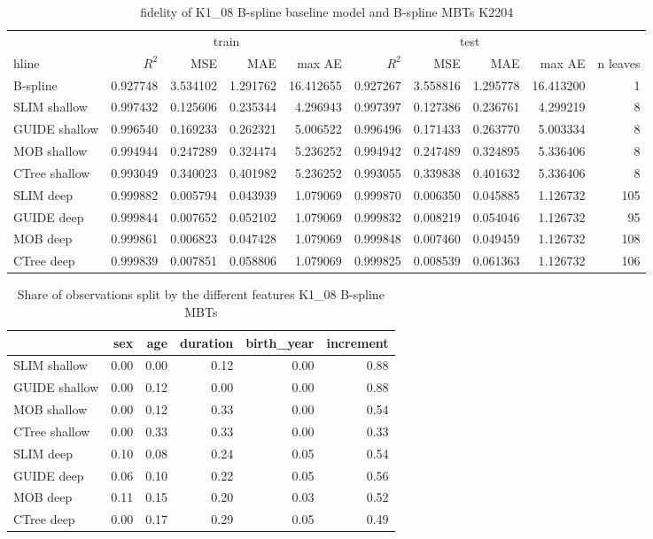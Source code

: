 \begin{table}[!htb]

\caption{fidelity of K1\_08 B-spline baseline model and  B-spline MBTs K2204}
\centering \scriptsize
\begin{tabular}[t]{l|r|r|r|r|r|r|r|r|r}
\hline
& \multicolumn{4}{|c|}{train} & \multicolumn{4}{|c|}{test} & \\
hline
 & $R^2$ & MSE & MAE & max AE & $R^2$ & MSE & MAE & max AE & n leaves\\
\hline

B-spline & 0.927748 & 3.534102 & 1.291762 & 16.412655 & 0.927267 & 3.558816 & 1.295778 & 16.413200 & 1\\
\hline
SLIM shallow & 0.997432 & 0.125606 & 0.235344 & 4.296943 & 0.997397 & 0.127386 & 0.236761 & 4.299219 & 8\\
GUIDE shallow & 0.996540 & 0.169233 & 0.262321 & 5.006522 & 0.996496 & 0.171433 & 0.263770 & 5.003334 & 8\\
MOB shallow & 0.994944 & 0.247289 & 0.324474 & 5.236252 & 0.994942 & 0.247489 & 0.324895 & 5.336406 & 8\\
CTree shallow & 0.993049 & 0.340023 & 0.401982 & 5.236252 & 0.993055 & 0.339838 & 0.401632 & 5.336406 & 8\\
\hline
SLIM deep & 0.999882 & 0.005794 & 0.043939 & 1.079069 & 0.999870 & 0.006350 & 0.045885 & 1.126732 & 105\\
GUIDE deep & 0.999844 & 0.007652 & 0.052102 & 1.079069 & 0.999832 & 0.008219 & 0.054046 & 1.126732 & 95\\
MOB deep & 0.999861 & 0.006823 & 0.047428 & 1.079069 & 0.999848 & 0.007460 & 0.049459 & 1.126732 & 108\\
CTree deep & 0.999839 & 0.007851 & 0.058806 & 1.079069 & 0.999825 & 0.008539 & 0.061363 & 1.126732 & 106\\
\hline
\end{tabular}
\label{tab:ins_k108_bsplines_surrogates_perf}
\end{table}




\begin{table}[!htb]
\caption{Share of observations split by the different features K1\_08 B-spline MBTs}
\centering \scriptsize
\begin{tabular}[t]{l|r|r|r|r|r}
\hline
  & sex & age & duration & birth\_year & increment\\
\hline
SLIM shallow & 0.00 & 0.00 & 0.12 & 0.00  & 0.88\\
GUIDE shallow & 0.00 & 0.12 & 0.00 & 0.00  & 0.88\\
MOB shallow & 0.00 & 0.12 & 0.33 & 0.00  & 0.54\\
CTree shallow & 0.00 & 0.33 & 0.33 & 0.00  & 0.33\\
\hline
SLIM deep & 0.10 & 0.08 & 0.24 & 0.05 & 0.54\\
GUIDE deep & 0.06 & 0.10 & 0.22 & 0.05 & 0.56\\
MOB deep & 0.11 & 0.15 & 0.20 & 0.03 & 0.52\\
CTree deep & 0.00 & 0.17 & 0.29 & 0.05 & 0.49\\
\hline
\end{tabular}
\label{tab:ins_k108_share}
\end{table}

